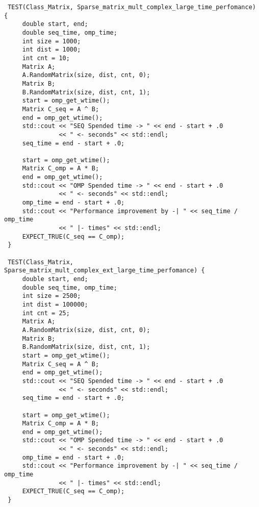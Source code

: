 \documentclass[12pt]{report}
\begin{document}
\begin{lstlisting}
 TEST(Class_Matrix, Sparse_matrix_mult_complex_large_time_perfomance) {
     double start, end;
     double seq_time, omp_time;
     int size = 1000;
     int dist = 1000;
     int cnt = 10;
     Matrix A;
     A.RandomMatrix(size, dist, cnt, 0);
     Matrix B;
     B.RandomMatrix(size, dist, cnt, 1);
     start = omp_get_wtime();
     Matrix C_seq = A ^ B;
     end = omp_get_wtime();
     std::cout << "SEQ Spended time -> " << end - start + .0
               << " <- seconds" << std::endl;
     seq_time = end - start + .0;

     start = omp_get_wtime();
     Matrix C_omp = A * B;
     end = omp_get_wtime();
     std::cout << "OMP Spended time -> " << end - start + .0
               << " <- seconds" << std::endl;
     omp_time = end - start + .0;
     std::cout << "Performance improvement by -| " << seq_time / omp_time
               << " |- times" << std::endl;
     EXPECT_TRUE(C_seq == C_omp);
 }

 TEST(Class_Matrix, Sparse_matrix_mult_complex_ext_large_time_perfomance) {
     double start, end;
     double seq_time, omp_time;
     int size = 2500;
     int dist = 100000;
     int cnt = 25;
     Matrix A;
     A.RandomMatrix(size, dist, cnt, 0);
     Matrix B;
     B.RandomMatrix(size, dist, cnt, 1);
     start = omp_get_wtime();
     Matrix C_seq = A ^ B;
     end = omp_get_wtime();
     std::cout << "SEQ Spended time -> " << end - start + .0
               << " <- seconds" << std::endl;
     seq_time = end - start + .0;

     start = omp_get_wtime();
     Matrix C_omp = A * B;
     end = omp_get_wtime();
     std::cout << "OMP Spended time -> " << end - start + .0
               << " <- seconds" << std::endl;
     omp_time = end - start + .0;
     std::cout << "Performance improvement by -| " << seq_time / omp_time
               << " |- times" << std::endl;
     EXPECT_TRUE(C_seq == C_omp);
 }

\end{lstlisting}
\end{document}
